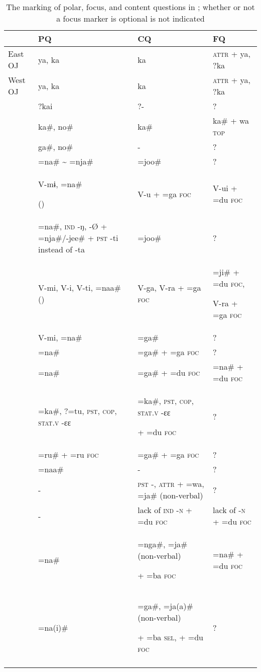 \begin{table}[p]
\caption{The marking of polar, focus, and content questions in ; whether or not a focus marker is optional is not indicated}
\label{tab:japa:3}
\small
\begin{tabularx}{\textwidth}{lQQl}
\lsptoprule
& \textbf{PQ} & \textbf{CQ} & \textbf{FQ}\\
\midrule
East OJ & ya, ka & ka & \textsc{attr} + ya, ?ka\\
West OJ & ya, ka & ka & \textsc{attr} + ya, ?ka\\
 & ?kai & ?- & ?\\
 & ka\#, no\# & ka\# & ka\# + wa \textsc{top}\\
 & ga\#, no\# & - & ?\\
 & =na\# {\textasciitilde} =nja\# & =joo\# & ?\\
 & V-mɨ, =na\#

() & V-u + =ga \textsc{foc} & V-ui + =du \textsc{foc}\\
 & =na\#, \textsc{ind} -ŋ, -Ø + =nja\#/-jee\# \textsc{+ pst} -ti instead of -ta & =joo\# & ?\\
 & V-mi, V-i, V-ti, =naa\# () & V-ga, V-ra + =ga \textsc{foc} & =ji\# + =du \textsc{foc},

V-ra + =ga \textsc{foc}\\
 & V-mi, =na\# & =ga\# & ?\\
 & =na\# & =ga\# + =ga \textsc{foc} & ?\\
 & =na\# & =ga\# + =du \textsc{foc} & =na\# + =du \textsc{foc}\\
 & =ka\#, ?=tu, \textsc{pst}, \textsc{cop}, \textsc{stat}.\textsc{v} -ɛɛ & =ka\#, \textsc{pst}, \textsc{cop}, \textsc{stat}.\textsc{v} -ɛɛ

+ =du \textsc{foc} & ?\\
 & =ru\# + =ru \textsc{foc} & =ga\# + =ga \textsc{foc} & ?\\
 & =naa\# & - & ?\\
 & - & \textsc{pst -, attr} + =wa, =ja\# (non-verbal) & ?\\
 & - & lack of \textsc{ind} -\textsc{n} + =du \textsc{foc} & lack of -\textsc{n} + =du \textsc{foc}\\
 & =na\# & =nga\#, =ja\# (non-verbal)

+ =ba \textsc{foc} & =na\# + =du \textsc{foc}\\
 & =na(i)\# & =ga\#, =ja(a)\# (non-verbal)

+ =ba \textsc{sel,} + =du \textsc{foc} & ?\\
\lspbottomrule
\end{tabularx}
\end{table}

